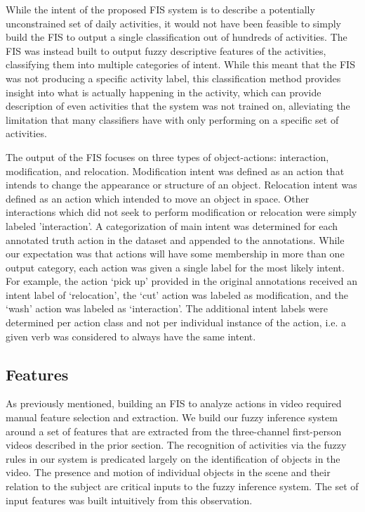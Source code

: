 \documentclass[12pt]{report}
\begin{document}
While the intent of the proposed FIS system is to describe a potentially unconstrained set of daily activities, it would not have been feasible to simply build the FIS to output a single classification out of hundreds of activities. The FIS was instead built to output fuzzy descriptive features of the activities, classifying them into multiple categories of intent. While this meant that the FIS was not producing a specific activity label, this classification method provides insight into what is actually happening in the activity, which can provide description of even activities that the system was not trained on, alleviating the limitation that many classifiers have with only performing on a specific set of activities.

The output of the FIS focuses on three types of object-actions: interaction, modification, and relocation. Modification intent was defined as an action that intends to change the appearance or structure of an object. Relocation intent was defined as an action which intended to move an object in space. Other interactions which did not seek to perform modification or relocation were simply labeled 'interaction'. A categorization of main intent was determined for each annotated truth action in the dataset and appended to the annotations. While our expectation was that actions will have some membership in more than one output category, each action was given a single label for the most likely intent. For example, the action `pick up' provided in the original annotations received an intent label of `relocation', the `cut' action was labeled as modification, and the `wash' action was labeled as `interaction'. The additional intent labels were determined per action class and not per individual instance of the action, i.e. a given verb was considered to always have the same intent.

\subsection{Features}
As previously mentioned, building an FIS to analyze actions in video required manual feature selection and extraction. We build our fuzzy inference system around a set of features that are extracted from the three-channel first-person videos described in the prior section. The recognition of activities via the fuzzy rules in our system is predicated largely on the identification of objects in the video. The presence and motion of individual objects in the scene and their relation to the subject are critical inputs to the fuzzy inference system. The set of input features was built intuitively from this observation.
\end{document}
